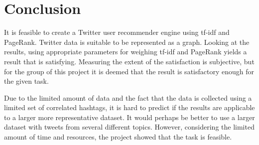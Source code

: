 \section{Conclusion}
\label{sec:conclusion}

It is feasible to create a Twitter user recommender engine using tf-idf and
PageRank. Twitter data is suitable to be represented as a graph. Looking at the
results, using appropriate parameters for weighing tf-idf and PageRank yields a
result that is satisfying. Measuring the extent of the satisfaction is
subjective, but for the group of this project it is deemed that the result is
satisfactory enough for the given task.

Due to the limited amount of data and the fact that the data is collected using
a limited set of correlated hashtags, it is hard to predict if the results are
applicable to a larger more representative dataset. It would perhaps be better
to use a larger dataset with tweets from several different topics. However, 
considering the limited amount of time and resources, the project showed
that the task is feasible.